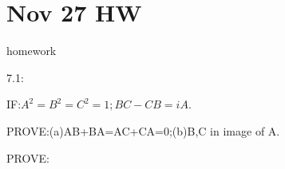 \documentclass{article}
\begin{document}
  \newpage
  \section{Nov 27 HW}
  homework

7.1:

IF:$A^2=B^2=C^2=1;BC-CB=iA$.

PROVE:(a)AB+BA=AC+CA=0;(b)B,C in image of A.

PROVE:
\end{document}

